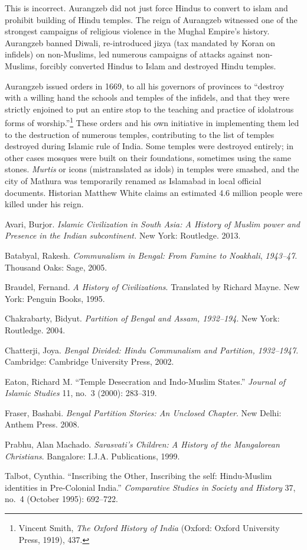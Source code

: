 This is incorrect. Aurangzeb did not just force Hindus to convert to islam and prohibit building of Hindu temples. The reign of Aurangzeb witnessed one of the strongest campaigns of religious violence in the Mughal Empire's history. Aurangzeb banned Diwali, re-introduced jizya (tax mandated by Koran on infidels) on non-Muslims, led numerous campaigns of attacks against non-Muslims, forcibly converted Hindus to Islam and destroyed Hindu temples.

Aurangzeb issued orders in 1669, to all his governors of provinces to “destroy with a willing hand the schools and temples of the infidels, and that they were strictly enjoined to put an entire stop to the teaching and practice of idolatrous forms of worship.”\footnote{Vincent Smith, \textit{The Oxford History of India} (Oxford: Oxford University Press, 1919), 437.} These orders and his own initiative in implementing them led to the destruction of numerous temples, contributing to the list of temples destroyed during Islamic rule of India. Some temples were destroyed entirely; in other cases mosques were built on their foundations, sometimes using the same stones. \textit{Murtis} or icons (mistranslated as idols) in temples were smashed, and the city of Mathura was temporarily renamed as Islamabad in local official documents. Historian Matthew White claims an estimated 4.6 million people were killed under his reign. 

\begin{thebibliography}{99}
 Avari, Burjor. \textit{Islamic Civilization in South Asia: A History of Muslim power and Presence in the Indian subcontinent.} New York: Routledge. 2013.

 Batabyal, Rakesh. \textit{Communalism in Bengal: From Famine to Noakhali}, \textit{1943--47}. Thousand Oaks: Sage, 2005. 

 Braudel, Fernand. \textit{A History of Civilizations}. Translated by Richard Mayne. New York: Penguin Books, 1995.

 Chakrabarty, Bidyut. \textit{Partition of Bengal and Assam, 1932--194}. New York: Routledge. 2004. 

 Chatterji, Joya. \textit{Bengal Divided: Hindu Communalism and Partition, 1932--1947}. Cambridge: Cambridge University Press, 2002.

 Eaton, Richard M. “Temple Desecration and Indo-Muslim States.” \textit{Journal of Islamic Studies} 11, no.\ 3 (2000): 283--319.

 Fraser, Bashabi. \textit{Bengal Partition Stories: An Unclosed Chapter}. New Delhi: Anthem Press. 2008. 

 Prabhu, Alan Machado. \textit{Sarasvati's Children: A History of the Mangalorean Christians}. Bangalore: I.J.A. Publications, 1999.

 Talbot, Cynthia. “Inscribing the Other, Inscribing the self: Hindu-Muslim identities in Pre-Colonial India.” \textit{Comparative Studies in Society and History} 37, no.\ 4 (October 1995): 692--722.
\end{thebibliography}
